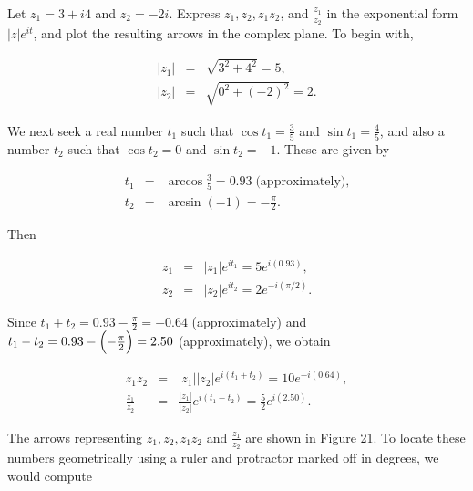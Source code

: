 \begin{example}
Let $z_{1} = 3 + i4$ and $z_{2} = -2i$. Express $z_{1}, z_{2}, z_{1}z_{2}$, and $\frac{z_{1}}{z_{2}}$ in the exponential form $|z| e^{it}$, and plot the resulting arrows 
in the complex plane. To begin with,


\begin{eqnarray*}
|z_{1}| &=& \sqrt{3^2 + 4^2} = 5,\\
|z_{2}| &=& \sqrt{0^2 + (-2)^2} = 2.
\end{eqnarray*}

\noindent We next seek a real number $t_{1}$ such that $\cos t_{1} = \frac{3}{5}$ and 
$\sin t_{1} = \frac{4}{5}$, and also a number $t_{2}$ such that $\cos t_{2} = 0$ and 
$\sin t_{2} = - 1$. These are given by 

\begin{eqnarray*}
t_{1} &=& \arccos \frac{3}{5} = 0.93 \;\mbox{(approximately),} \\
t_{2} &=& \arcsin(-1) = - \frac{\pi}{2}.
\end{eqnarray*}

\noindent Then

\begin{eqnarray*}
z_{1} &=& |z_{1}| e^{it_{1}} = 5e^{i(0.93)},\\
z_{2} &=& |z_{2}| e^{it_{2}} = 2e^{-i(\pi/2)}.
\end{eqnarray*}

\noindent Since $t_{1} + t_{2} = 0.93 - \frac{\pi}{2} = - 0.64$ (approximately) and 
$t_{1} - t_{2} = 0.93 - \Bigl(-\frac{\pi}{2}\Bigr) = 2.50$ (approximately), we obtain 

\begin{eqnarray*}
               z_{1}z_{2} &=& |z_{1}| |z_{2}| e^{i(t_{1} + t_{2})} = 10 e^{-i(0.64)},   \\
\frac{z_1}{z_2} &=& \frac{|z_1|}{|z_2|} e^{i(t_{1} - t_{2})} = \frac{5}{2} e^{i(2.50)} .
\end{eqnarray*}


The arrows representing $z_{1}, z_{2}, z_{1}z_{2}$ and $\frac{z_{1}}{z_{2}}$ are shown in Figure 21. To  locate these numbers geometrically using a ruler and protractor marked off in degrees, we would compute 


\end{example}

